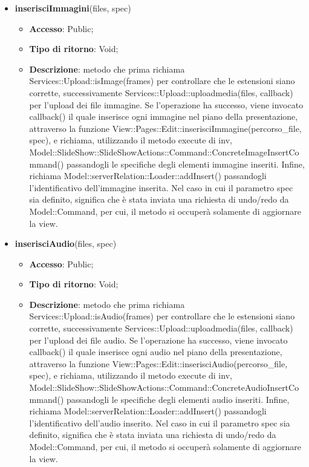 {{\begin{itemize}
\begin{itemize}
		\end{itemize}
		\item \textbf{inserisciImmagini}(files, spec)
		\begin{itemize}
			\item \textbf{Accesso}: Public;
			\item \textbf{Tipo di ritorno}: Void;
			\item \textbf{Descrizione}: metodo che prima richiama Services::\-Upload::\-isImage(frames) per controllare che le estensioni siano corrette, successivamente Services::\-Upload::\-uploadmedia(files, callback) per l'upload dei file immagine. Se l'operazione ha successo, viene invocato callback() il quale inserisce ogni immagine nel piano della presentazione, attraverso la funzione View::Pages::Edit::inserisciImmagine(percorso_file, spec), e richiama, utilizzando il metodo execute di inv, Model::\-SlideShow::\-SlideShowActions::\-Command::\-ConcreteImageInsertCommand() passandogli le specifiche degli elementi immagine inseriti. Infine, richiama Model::\-serverRelation::\-Loader::\-addInsert() passandogli l'identificativo dell'immagine inserita. Nel caso in cui il parametro spec sia definito, significa che è stata inviata una richiesta di undo/redo da Model::\-Command, per cui, il metodo si occuperà solamente di aggiornare la view.
		\end{itemize}
		\item \textbf{inserisciAudio}(files, spec)
		\begin{itemize}
			\item \textbf{Accesso}: Public;
			\item \textbf{Tipo di ritorno}: Void;
			\item \textbf{Descrizione}: metodo che prima richiama Services::\-Upload::\-isAudio(frames) per controllare che le estensioni siano corrette, successivamente Services::\-Upload::\-uploadmedia(files, callback) per l'upload dei file audio. Se l'operazione ha successo, viene invocato callback() il quale inserisce ogni audio nel piano della presentazione, attraverso la funzione View::Pages::Edit::inserisciAudio(percorso_file, spec), e richiama, utilizzando il metodo execute di inv, Model::\-SlideShow::\-SlideShowActions::\-Command::\-ConcreteAudioInsertCommand() passandogli le specifiche degli elementi audio inseriti. Infine, richiama Model::\-serverRelation::\-Loader::\-addInsert() passandogli l'identificativo dell'audio inserito. Nel caso in cui il parametro spec sia definito, significa che è stata inviata una richiesta di undo/redo da Model::\-Command, per cui, il metodo si occuperà solamente di aggiornare la view.

\end{itemize}
\end{itemize}}}
